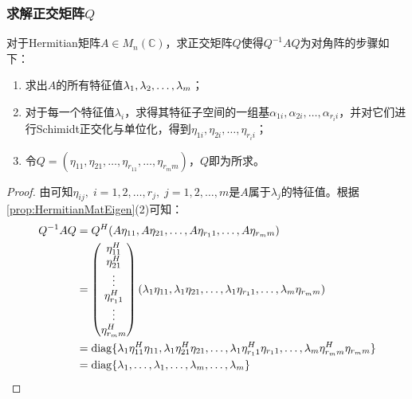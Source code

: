 \subsubsection{求解正交矩阵$Q$}
\begin{theorem}
	对于Hermitian矩阵$A\in M_{n}(\mathbb{C})$，求正交矩阵$Q$使得$Q^{-1}AQ$为对角阵的步骤如下：
	\begin{enumerate}
		\item 求出$A$的所有特征值$\lambda_1, \lambda_2, \dots, \lambda_{m}$；
		\item 对于每一个特征值$\lambda_i$，求得其特征子空间的一组基$\alpha_{1i},\alpha_{2i},\dots,\alpha_{r_ii}$，并对它们进行Schimidt正交化与单位化，得到$\eta_{1i},\eta_{2i},\dots,\eta_{r_ii}$；
		\item 令$Q=(\eta_{11},\eta_{21},\dots,\eta_{r_11},\dots,\eta_{r_mm})$，$Q$即为所求。
	\end{enumerate}
\end{theorem}
\begin{proof}
	由可知$\eta_{ij},\;i=1,2,\dots,r_j,\;j=1,2,\dots,m$是$A$属于$\lambda_j$的特征值。根据\cref{prop:HermitianMatEigen}(2)可知：
	\begin{align*}
		Q^{-1}AQ
		&=Q^H(A\eta_{11},A\eta_{21},\dots,A\eta_{r_11},\dots,A\eta_{r_mm}) \\
		&=
		\begin{pmatrix}
			\eta_{11}^H \\
			\eta_{21}^H \\
			\vdots \\
			\eta_{r_11}^H \\
			\vdots \\
			\eta_{r_mm}^H
		\end{pmatrix}
		(\lambda_1\eta_{11},\lambda_1\eta_{21},\dots,\lambda_1\eta_{r_11},\dots,\lambda_m\eta_{r_mm}) \\
		&=\operatorname{diag}\{\lambda_1\eta_{11}^H\eta_{11},\lambda_1\eta_{21}^H\eta_{21},\dots,\lambda_1\eta_{r_11}^H\eta_{r_11},\dots,\lambda_m\eta_{r_mm}^H\eta_{r_mm}\} \\
		&=\operatorname{diag}\{\lambda_1,\dots,\lambda_1,\dots,\lambda_m,\dots,\lambda_m\}\qedhere
	\end{align*}
\end{proof}
